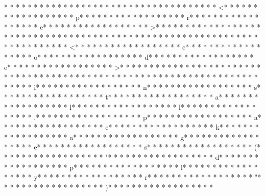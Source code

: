 * * *  * * *  * * *  *  * * *  *  * * *  * 	* * *  * * *  * * *  *  * * *  *  * * *  * <* * *  * * *  * * *  *  * * *  *  * * *  * p* * *  * * *  * * *  *  * * *  *  * * *  * r* * *  * * *  * * *  *  * * *  *  * * *  * e* * *  * * *  * * *  *  * * *  *  * * *  * >* * *  * * *  * * *  *  * * *  *  * * *  * 
* * *  * * *  * * *  *  * * *  *  * * *  * 	* * *  * * *  * * *  *  * * *  *  * * *  * 	* * *  * * *  * * *  *  * * *  *  * * *  * <* * *  * * *  * * *  *  * * *  *  * * *  * c* * *  * * *  * * *  *  * * *  *  * * *  * o* * *  * * *  * * *  *  * * *  *  * * *  * d* * *  * * *  * * *  *  * * *  *  * * *  * e* * *  * * *  * * *  *  * * *  *  * * *  * >* * *  * * *  * * *  *  * * *  *  * * *  * 
* * *  * * *  * * *  *  * * *  *  * * *  * 	* * *  * * *  * * *  *  * * *  *  * * *  * 	* * *  * * *  * * *  *  * * *  *  * * *  * i* * *  * * *  * * *  *  * * *  *  * * *  * n* * *  * * *  * * *  *  * * *  *  * * *  * s* * *  * * *  * * *  *  * * *  *  * * *  * t* * *  * * *  * * *  *  * * *  *  * * *  * a* * *  * * *  * * *  *  * * *  *  * * *  * l* * *  * * *  * * *  *  * * *  *  * * *  * l* * *  * * *  * * *  *  * * *  *  * * *  * .* * *  * * *  * * *  *  * * *  *  * * *  * p* * *  * * *  * * *  *  * * *  *  * * *  * a* * *  * * *  * * *  *  * * *  *  * * *  * c* * *  * * *  * * *  *  * * *  *  * * *  * k* * *  * * *  * * *  *  * * *  *  * * *  * a* * *  * * *  * * *  *  * * *  *  * * *  * g* * *  * * *  * * *  *  * * *  *  * * *  * e* * *  * * *  * * *  *  * * *  *  * * *  * s* * *  * * *  * * *  *  * * *  *  * * *  * (* * *  * * *  * * *  *  * * *  *  * * *  * "* * *  * * *  * * *  *  * * *  *  * * *  * d* * *  * * *  * * *  *  * * *  *  * * *  * p* * *  * * *  * * *  *  * * *  *  * * *  * l* * *  * * *  * * *  *  * * *  *  * * *  * y* * *  * * *  * * *  *  * * *  *  * * *  * r* * *  * * *  * * *  *  * * *  *  * * *  * "* * *  * * *  * * *  *  * * *  *  * * *  * )* * *  * * *  * * *  *  * * *  *  * * *  * 
